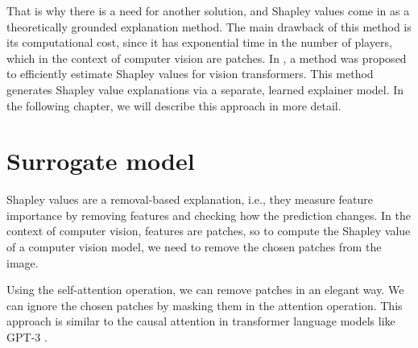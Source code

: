\documentclass[magisterska,en]{pracamgr}
\begin{document}
That is why there is a need for another solution, and Shapley values come in as a theoretically grounded explanation method. The main drawback of this method is its computational cost, since it has exponential time in the number of players, which in the context of computer vision are patches. In \cite{DBLP:conf/iclr/Covert0L23}, a method was proposed to efficiently estimate Shapley values for vision transformers. This method generates Shapley value explanations via a separate, learned explainer model. In the following chapter, we will describe this approach in more detail.



\section{Surrogate model}\label{s:surrogate}
Shapley values are a removal-based explanation, i.e., they measure feature importance by removing features and checking how the prediction changes. In the context of computer vision, features are patches, so to compute the Shapley value of a computer vision model, we need to remove the chosen patches from the image.

Using the self-attention operation, we can remove patches in an elegant way. We can ignore the chosen patches by masking them in the attention operation. This approach is similar to the causal attention in transformer language models like GPT-3 \cite{DBLP:conf/nips/BrownMRSKDNSSAA20}.
\end{document}
